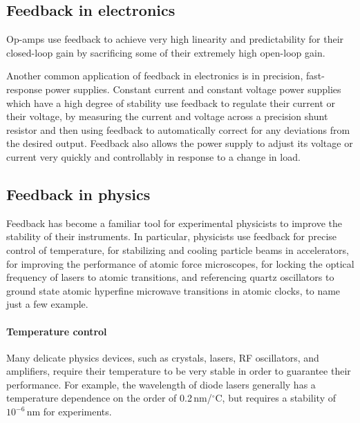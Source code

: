 \documentclass{article}
\begin{document}
\subsection{Feedback in electronics}
Op-amps use feedback to achieve very high linearity and predictability for their closed-loop gain by sacrificing some of their extremely high open-loop gain.

Another common application of feedback in electronics is in precision, fast- response power supplies. Constant current and constant voltage power supplies which have a high degree of stability use feedback to regulate their current or their voltage, by measuring the current and voltage across a precision shunt resistor and then using feedback to automatically correct for any deviations from the desired output. Feedback also allows the power supply to adjust its voltage or current very quickly and controllably in response to a change in load.

\subsection{Feedback in physics}
Feedback has become a familiar tool for experimental physicists to improve the stability of their instruments. In particular, physicists use feedback for precise control of temperature, for stabilizing and cooling particle beams in accelerators, for improving the performance of atomic force microscopes, for locking the optical frequency of lasers to atomic transitions, and referencing quartz oscillators to ground state atomic hyperfine microwave transitions in atomic clocks, to name just a few example.

\paragraph{Temperature control} Many delicate physics devices, such as crystals, lasers, RF oscillators, and amplifiers, require their temperature to be very stable in order to guarantee their performance. For example, the wavelength of diode lasers generally has a temperature dependence on the order of 0.2\,nm/$^\circ$C, but requires a stability of $10^{-6}$\,nm for experiments.
\end{document}
